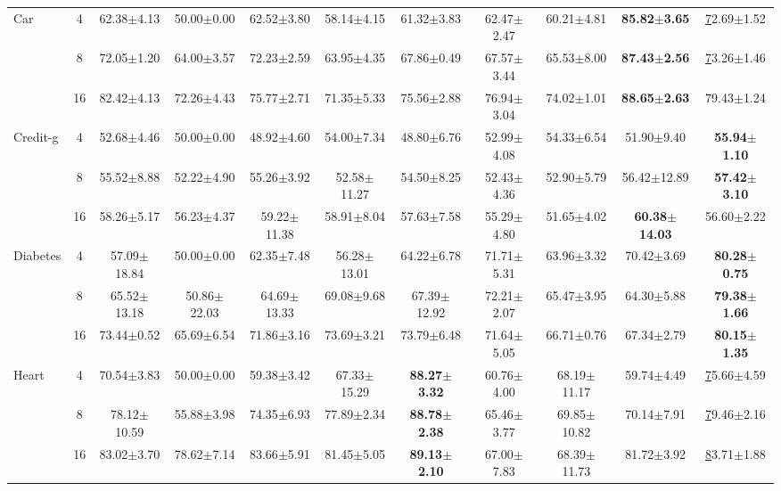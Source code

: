 \documentclass{article}
\theoremstyle{plain}
\theoremstyle{definition}
\theoremstyle{remark}
\begin{document}
\begin{table}[t!]
{\begin{tabular}{@{}l|c|cccccccc|c@{}}
Car & 4 & 62.38$\pm$4.13 & 50.00$\pm$0.00 & 62.52$\pm$3.80 & 58.14$\pm$4.15 & 61.32$\pm$3.83 & 62.47$\pm$2.47 & 60.21$\pm$4.81 & \textbf{85.82$\pm$3.65} & {\ul 72.69$\pm$1.52} \\
 & 8 & 72.05$\pm$1.20 & 64.00$\pm$3.57 & 72.23$\pm$2.59 & 63.95$\pm$4.35 & 67.86$\pm$0.49 & 67.57$\pm$3.44 & 65.53$\pm$8.00 & \textbf{87.43$\pm$2.56} & {\ul 73.26$\pm$1.46} \\
 & 16 & 82.42$\pm$4.13 & 72.26$\pm$4.43 & 75.77$\pm$2.71 & 71.35$\pm$5.33 & 75.56$\pm$2.88 & 76.94$\pm$3.04 & 74.02$\pm$1.01 & \textbf{88.65$\pm$2.63} & 79.43$\pm$1.24 \\ \midrule
Credit-g & 4 & 52.68$\pm$4.46 & 50.00$\pm$0.00 & 48.92$\pm$4.60 & 54.00$\pm$7.34 & 48.80$\pm$6.76 & 52.99$\pm$4.08 & 54.33$\pm$6.54 & 51.90$\pm$9.40 & \textbf{55.94$\pm$1.10} \\
 & 8 & 55.52$\pm$8.88 & 52.22$\pm$4.90 & 55.26$\pm$3.92 & 52.58$\pm$11.27 & 54.50$\pm$8.25 & 52.43$\pm$4.36 & 52.90$\pm$5.79 & 56.42$\pm$12.89 & \textbf{57.42$\pm$3.10} \\
 & 16 & 58.26$\pm$5.17 & 56.23$\pm$4.37 & 59.22$\pm$11.38 & 58.91$\pm$8.04 & 57.63$\pm$7.58 & 55.29$\pm$4.80 & 51.65$\pm$4.02 & \textbf{60.38$\pm$14.03} & 56.60$\pm$2.22 \\ \midrule
Diabetes & 4 & 57.09$\pm$18.84 & 50.00$\pm$0.00 & 62.35$\pm$7.48 & 56.28$\pm$13.01 & 64.22$\pm$6.78 & 71.71$\pm$5.31 & 63.96$\pm$3.32 & 70.42$\pm$3.69 & \textbf{80.28$\pm$0.75} \\
 & 8 & 65.52$\pm$13.18 & 50.86$\pm$22.03 & 64.69$\pm$13.33 & 69.08$\pm$9.68 & 67.39$\pm$12.92 & 72.21$\pm$2.07 & 65.47$\pm$3.95 & 64.30$\pm$5.88 & \textbf{79.38$\pm$1.66} \\
 & 16 & 73.44$\pm$0.52 & 65.69$\pm$6.54 & 71.86$\pm$3.16 & 73.69$\pm$3.21 & 73.79$\pm$6.48 & 71.64$\pm$5.05 & 66.71$\pm$0.76 & 67.34$\pm$2.79 & \textbf{80.15$\pm$1.35} \\ \midrule
Heart & 4 & 70.54$\pm$3.83 & 50.00$\pm$0.00 & 59.38$\pm$3.42 & 67.33$\pm$15.29 & \textbf{88.27$\pm$3.32} & 60.76$\pm$4.00 & 68.19$\pm$11.17 & 59.74$\pm$4.49 & {\ul 75.66$\pm$4.59} \\
 & 8 & 78.12$\pm$10.59 & 55.88$\pm$3.98 & 74.35$\pm$6.93 & 77.89$\pm$2.34 & \textbf{88.78$\pm$2.38} & 65.46$\pm$3.77 & 69.85$\pm$10.82 & 70.14$\pm$7.91 & {\ul 79.46$\pm$2.16} \\
 & 16 & 83.02$\pm$3.70 & 78.62$\pm$7.14 & 83.66$\pm$5.91 & 81.45$\pm$5.05 & \textbf{89.13$\pm$2.10} & 67.00$\pm$7.83 & 68.39$\pm$11.73 & 81.72$\pm$3.92 & {\ul 83.71$\pm$1.88} \\ \midrule

\end{tabular}}
\end{table}
\end{document}
